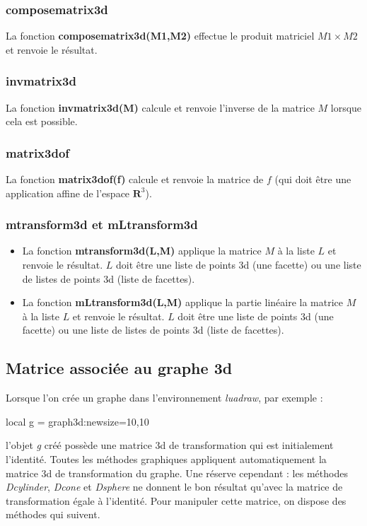 \subsubsection{composematrix3d}
La fonction \textbf{composematrix3d(M1,M2)} effectue le produit matriciel $M1\times M2$ et renvoie le résultat.

\subsubsection{invmatrix3d}
La fonction \textbf{invmatrix3d(M)} calcule et renvoie l'inverse de la matrice $M$ lorsque cela est possible.

\subsubsection{matrix3dof}

La fonction \textbf{matrix3dof(f)} calcule et renvoie la matrice de $f$ (qui doit être une application affine de l'espace $\mathbf R^3$).


\subsubsection{mtransform3d et mLtransform3d}
\begin{itemize}
    \item La fonction \textbf{mtransform3d(L,M)} applique la matrice $M$ à la liste $L$ et renvoie le résultat. $L$ doit être une liste de points 3d (une facette) ou une liste de listes de points 3d (liste de facettes).
    \item La fonction \textbf{mLtransform3d(L,M)} applique la partie linéaire la matrice $M$ à la liste $L$ et renvoie le résultat. $L$ doit être une liste de points 3d (une facette) ou une liste de listes de points 3d (liste de facettes).
\end{itemize}

\subsection{Matrice associée au graphe 3d}

Lorsque l'on crée un graphe dans l'environnement \emph{luadraw}, par exemple :
\begin{Luacode}
local g = graph3d:new{size={10,10}}
\end{Luacode}
l'objet \emph{g} créé possède une matrice 3d de transformation qui est initialement l'identité. Toutes les méthodes graphiques appliquent automatiquement la matrice 3d de transformation du graphe. Une réserve cependant : les méthodes \emph{Dcylinder}, \emph{Dcone} et \emph{Dsphere} ne donnent le bon résultat qu'avec la matrice de transformation égale à l'identité. Pour manipuler cette matrice, on dispose des méthodes qui suivent.

